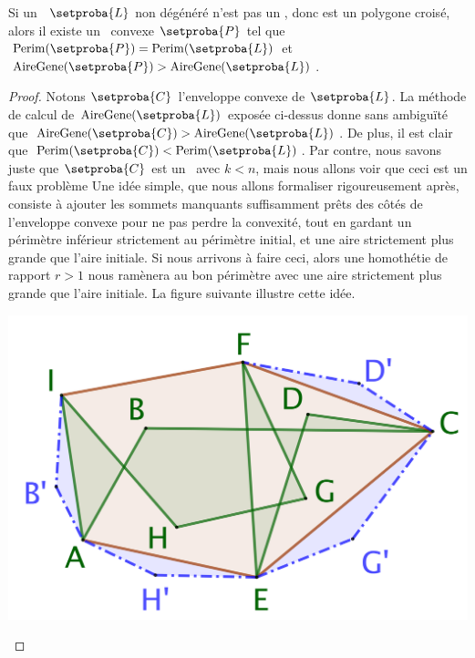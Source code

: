 

\begin{fact} \label{no-cross-max}
    Si un \ncycle\ $\setproba{L}$ non dégénéré n'est pas un \ngone, donc est un polygone croisé, alors il existe un \ngone\ convexe $\setproba{P}$ tel que
	$\perim{\setproba{P}} = \perim{\setproba{L}}$
	et
	$\garea{\setproba{P}} > \garea{\setproba{L}}$.
\end{fact}


\begin{proof}
	Notons $\setproba{C}$ l'enveloppe convexe de $\setproba{L}$. La méthode de calcul de $\garea{\setproba{L}}$ exposée ci-dessus donne sans ambiguïté que $\garea{\setproba{C}} > \garea{\setproba{L}}$. De plus, il est clair que $\perim{\setproba{C}} < \perim{\setproba{L}}$.
	Par contre, nous savons juste que $\setproba{C}$ est un \kgone\ avec $k < n$, mais nous allons voir que ceci est un faux problème
	Une idée simple, que nous allons formaliser rigoureusement après, consiste à ajouter les sommets manquants suffisamment prêts des côtés de l'enveloppe convexe pour ne pas perdre la convexité, tout en gardant un périmètre inférieur strictement au périmètre initial, et une aire strictement plus grande que l'aire initiale. Si nous arrivons à faire ceci, alors une homothétie de rapport $r > 1$ nous ramènera au bon périmètre avec une aire strictement plus grande que l'aire initiale.
	La figure suivante illustre cette idée.

	\begin{center}
		\includegraphics[scale=.4]{content/polygon/at-least-one/convex-hull-distortion.png}
	\end{center}



\end{proof}
